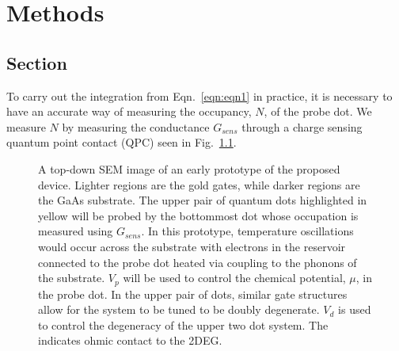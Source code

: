 
\chapter{Methods}
\label{ch:Methods}
\section{Section}
\label{sec:section}

To carry out the integration from Eqn.~\ref{eqn:eqn1} in practice, it is necessary to have an accurate way of measuring the occupancy, $N$, of the probe dot. We measure $N$ by measuring the conductance $G_{sens}$ through a charge sensing quantum point contact (QPC) seen in Fig.~\ref{fig:device}. 
\begin{figure}[h]
\centering
{}
\caption{ A top-down SEM image of an early prototype of the proposed device. Lighter regions are the gold gates, while darker regions are the GaAs substrate. The upper pair of quantum dots highlighted in yellow will be probed by the bottommost dot whose occupation is measured using $G_{sens}$. In this prototype, temperature oscillations would occur across the substrate with electrons in the reservoir connected to the probe dot heated via coupling to the phonons of the substrate. $V_p$ will be used to control the chemical potential, $\mu$, in the probe dot. In the upper pair of dots, similar gate structures allow for the system to be tuned to be doubly degenerate. $V_d$ is used to control the degeneracy of the upper two dot system. The indicates ohmic contact to the 2DEG.}

\label{fig:device}       %
\end{figure}
